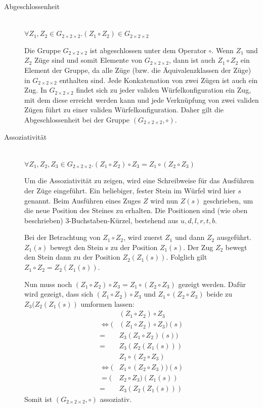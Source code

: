 \documentclass[12pt,a4paper, usenames, dvipsnames]{article}
\theoremstyle{mystyle}
\theoremstyle{definition}
\newcommand{\Gtwo}{\ensuremath{G_{2\times 2\times 2}}}
\begin{document}
\begin{description}
\item [Abgeschlossenheit] \ \\
$\forall Z_1,Z_2 \in \Gtwo .  (Z_1 \circ Z_2) \in \Gtwo $ 


Die Gruppe $\Gtwo$ ist abgeschlossen unter dem Operator $\circ$. Wenn $Z_1 $ und $Z_2$ Züge sind und somit Elemente von $\Gtwo$, dann ist auch $Z_1 \circ Z_2$ ein Element der Gruppe, da alle Züge (bzw. die Äquivalenzklassen der Züge) in $\Gtwo$ enthalten sind. Jede Konkatenation von zwei Zügen ist auch ein Zug. In $\Gtwo$ findet sich zu jeder validen Würfelkonfiguration ein Zug, mit dem diese erreicht werden kann und jede Verknüpfung von zwei validen Zügen führt zu einer validen Würfelkonfiguration. Daher gilt die Abgeschlossenheit bei der Gruppe $(\Gtwo, \circ)$.



\item [Assoziativität] \ \\
$\forall Z_1,Z_2,Z_3 \in \Gtwo.(Z_1 \circ Z_2) \circ Z_3 = Z_1 \circ (Z_2 \circ Z_3)$ 


Um die Assoziativität zu zeigen, wird eine Schreibweise für das Ausführen der Züge eingeführt. Ein beliebiger, fester Stein im Würfel wird hier $s$ genannt. Beim Ausführen eines Zuges $Z$ wird nun $Z(s)$ geschrieben, um die neue Position des Steines zu erhalten. Die Positionen sind (wie oben beschrieben) 3-Buchstaben-Kürzel, bestehend aus $u, d, l, r, t, b$. 

Bei der Betrachtung von $Z_1 \circ Z_2 $, wird zuerst $Z_1$ und dann $Z_2$ ausgeführt. $Z_1(s)$ bewegt den Stein s zu der Position $Z_1(s)$. Der Zug $Z_2$ bewegt den Stein dann zu der Position $Z_2(Z_1(s))$. Folglich gilt $Z_1 \circ Z_2 = Z_2(Z_1(s))$. 


Nun muss noch $(Z_1 \circ Z_2) \circ Z_3 = Z_1 \circ (Z_2 \circ Z_3)$ gezeigt werden. Dafür wird gezeigt, dass sich $(Z_1 \circ Z_2) \circ Z_3$ und $Z_1 \circ (Z_2 \circ Z_3)$ beide zu $Z_3(Z_2(Z_1(s))$ umformen lassen: 
\begin{align*}
& (Z_1 \circ Z_2) \circ Z_3  \\
\Leftrightarrow (&(Z_1 \circ Z_2) \circ Z_3)(s) \\
= & Z_3(Z_1 \circ Z_2)(s)) \\
= & Z_3(Z_2(Z_1(s)))  
\end{align*}
\begin{align*}
&Z_1 \circ (Z_2 \circ Z_3) \\
\Leftrightarrow (&Z_1 \circ (Z_2 \circ Z_3))(s) \\
= (&Z_2 \circ Z_3)(Z_1(s)) \\
= \ \ & Z_3(Z_2(Z_1(s)))  
\end{align*}
Somit ist $(\Gtwo, \circ)$ assoziativ.


\end{description}
\end{document}
